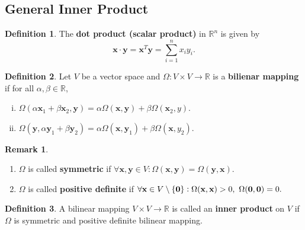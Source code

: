 \documentclass[12pt,openany]{book}
\theoremstyle{definition}
\newtheorem{definition}{Definition}[chapter]
\newtheorem{remark}{Remark}[chapter]
\newcommand{\R}{\mathbb{R}}
\begin{document}
	\subsection{General Inner Product}
	\begin{tcolorbox}[colframe=defcolor,title={\color{white}\bf Dot Product (Scalar Product)}]
		\begin{definition}
			The \textbf{dot product (scalar product)} in \(\R^n\) is given by \[
			\textbf{x}\cdot\textbf{y}=\textbf{x}^T\textbf{y}=\sum_{i=1}^nx_iy_i.
			\]
		\end{definition}
	\end{tcolorbox}
	\vspace{8pt}
	\begin{tcolorbox}[colframe=defcolor,title={\color{white}\bf Bilinaer Mapping}]
		\begin{definition}
			Let \(V\) be a vector space and \(\Omega:V\times V\to\R\) is a \textbf{bilienar mapping} if for all \(\alpha,\beta\in\R\),  \begin{enumerate}[(i)]
				\item $\Omega(\alpha \textbf{x}_1+\beta\textbf{x}_2,\textbf{y}) = \alpha\Omega(\textbf{x},\textbf{y})+\beta\Omega(\textbf{x}_2,y)$.
				\item $\Omega(\textbf{y},\alpha\textbf{y}_1+\beta\textbf{y}_2) = \alpha\Omega(\textbf{x},\textbf{y}_1)+\beta\Omega(\textbf{x},y_2)$.
			\end{enumerate}
		\end{definition}
	\end{tcolorbox}
	\begin{remark}
		\ \begin{enumerate}[(1)]
			\item \(\Omega\) is called \textbf{symmetric} if \(\forall\textbf{x},\textbf{y}\in V:\Omega(\textbf{x},\textbf{y})=\Omega(\textbf{y},\textbf{x})\).
			\item \(\Omega\) is called \textbf{positive definite} if $
			\forall \textbf{x}\in V\setminus\set{\textbf{0}}:\Omega(\textbf{x},\textbf{x})>0,\ \Omega(\textbf{0},\textbf{0})=0.$
		\end{enumerate}
	\end{remark}
	\vspace{8pt}
	\begin{tcolorbox}[colframe=defcolor,title={\color{white}\bf Inner Product}]
		\begin{definition}
			A bilinear mapping \(V\times V\to\R\) is called an \textbf{inner product} on \(V\) if \(\Omega\) is symmetric and positive definite bilinear mapping. 
		\end{definition}
	\end{tcolorbox}
	
\end{document}

